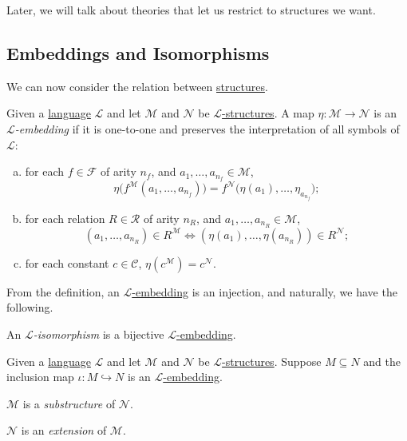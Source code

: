 \begin{note}
	Later, we will talk about theories that let us restrict to structures we want.
\end{note}

\subsection{Embeddings and Isomorphisms}
We can now consider the relation between \hyperref[def:structure]{structures}.

\begin{definition}[Embedding]\label{def:embedding}
	Given a \hyperref[def:language]{language} \(\mathcal{L} \) and let \(\mathcal{M} \) and \(\mathcal{N} \) be \hyperref[def:structure]{\(\mathcal{L} \)-structures}. A map \(\eta \colon \mathcal{M} \to \mathcal{N}\) is an \emph{\(\mathcal{L} \)-embedding} if it is one-to-one and preserves the interpretation of all symbols of \(\mathcal{L} \):
	\begin{enumerate}[(a)]
		\item for each \(f\in \mathcal{F} \) of arity \(n_f\), and \(a_1, \ldots , a_{n_f}\in \mathcal{M} \),
		      \[
			      \eta \big(f^{\mathcal{M} }(a_1, \ldots , a_{n_f})\big) = f^{\mathcal{N}} \big( \eta (a_1), \ldots , \eta _{a_{n_f}}\big);
		      \]
		\item for each relation \(R\in \mathcal{R} \) of arity \(n_R\), and \(a_1, \ldots , a_{n_R}\in \mathcal{M} \),
		      \[
			      (a_1, \ldots , a_{n_R})\in R^{\mathcal{M} } \iff (\eta (a_1), \ldots , \eta (a_{n_R})) \in R^{\mathcal{N} };
		      \]
		\item for each constant \(c\in \mathcal{C} \), \(\eta (c^{\mathcal{M} } ) = c^{\mathcal{N} }\).
	\end{enumerate}
\end{definition}

From the definition, an \hyperref[def:embedding]{\(\mathcal{L} \)-embedding} is an injection, and naturally, we have the following.

\begin{definition}[Isomorphism]\label{def:isomorphism}
	An \emph{\(\mathcal{L} \)-isomorphism} is a bijective \hyperref[def:embedding]{\(\mathcal{L} \)-embedding}.
\end{definition}

\begin{definition*}
	Given a \hyperref[def:language]{language} \(\mathcal{L} \) and let \(\mathcal{M} \) and \(\mathcal{N} \) be \hyperref[def:structure]{\(\mathcal{L} \)-structures}. Suppose \(M \subseteq N\) and the inclusion map \(\iota \colon M \hookrightarrow N\) is an \hyperref[def:embedding]{\(\mathcal{L} \)-embedding}.
	\begin{definition}[Substructure]\label{def:substructure}
		\(\mathcal{M}\) is a \emph{substructure} of \(\mathcal{N} \).
	\end{definition}

	\begin{definition}[Extension]\label{def:extension}
		\(\mathcal{N} \) is an \emph{extension} of \(\mathcal{M} \).
	\end{definition}
\end{definition*}

